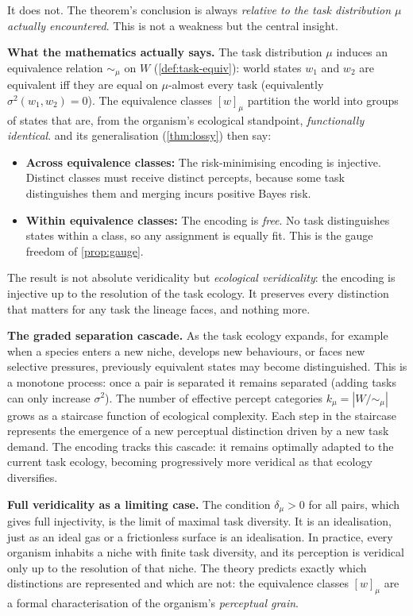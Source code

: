 \documentclass[12pt]{article}
\newcommand{\dmu}{\delta_\mu}
\newcommand{\kmu}{k_\mu}
\newcommand{\sigmasq}{\sigma^2}
\begin{document}
It does not. The theorem's conclusion is always \emph{relative to the task distribution $\mu$ actually encountered}. This is not a weakness but the central insight.

\textbf{What the mathematics actually says.} The task distribution $\mu$ induces an equivalence relation ${\sim_\mu}$ on $W$ (\cref{def:task-equiv}): world states $w_1$ and $w_2$ are equivalent iff they are equal on $\mu$-almost every task (equivalently $\sigmasq(w_1, w_2) = 0$). The equivalence classes $[w]_\mu$ partition the world into groups of states that are, from the organism's ecological standpoint, \emph{functionally identical}.  and its generalisation (\cref{thm:lossy}) then say:

\begin{itemize}
\item \textbf{Across equivalence classes:} The risk-minimising encoding is injective. Distinct classes must receive distinct percepts, because some task distinguishes them and merging incurs positive Bayes risk.
\item \textbf{Within equivalence classes:} The encoding is \emph{free}. No task distinguishes states within a class, so any assignment is equally fit. This is the gauge freedom of \cref{prop:gauge}.
\end{itemize}

The result is not absolute veridicality but \emph{ecological veridicality}: the encoding is injective up to the resolution of the task ecology. It preserves every distinction that matters for any task the lineage faces, and nothing more.

\textbf{The graded separation cascade.} As the task ecology expands, for example when a species enters a new niche, develops new behaviours, or faces new selective pressures, previously equivalent states may become distinguished. This is a monotone process: once a pair is separated it remains separated (adding tasks can only increase $\sigmasq$). The number of effective percept categories $\kmu = |W/{\sim_\mu}|$ grows as a staircase function of ecological complexity. Each step in the staircase represents the emergence of a new perceptual distinction driven by a new task demand. The encoding tracks this cascade: it remains optimally adapted to the current task ecology, becoming progressively more veridical as that ecology diversifies.

\textbf{Full veridicality as a limiting case.} The condition $\dmu > 0$ for all pairs, which gives full injectivity, is the limit of maximal task diversity. It is an idealisation, just as an ideal gas or a frictionless surface is an idealisation. In practice, every organism inhabits a niche with finite task diversity, and its perception is veridical only up to the resolution of that niche. The theory predicts exactly which distinctions are represented and which are not: the equivalence classes $[w]_\mu$ are a formal characterisation of the organism's \emph{perceptual grain}.
\end{document}
